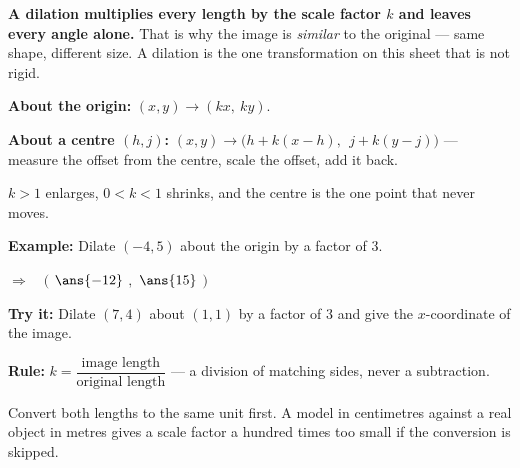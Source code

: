 \documentclass[12pt]{article}
\begin{document}

\begin{formulabox}
\textbf{A dilation multiplies every length by the scale factor $k$ and leaves every angle alone.} That is why the image is \emph{similar} to the original --- same shape, different size. A dilation is the one transformation on this sheet that is not rigid.
\end{formulabox}


\begin{formulabox}
\textbf{About the origin:} $(x, y) \to (kx,\ ky)$.\par
\textbf{About a centre $(h, j)$:} $(x, y) \to \bigl(h + k(x - h),\ \ j + k(y - j)\bigr)$ --- measure the offset from the centre, scale the offset, add it back.\par
$k > 1$ enlarges, $0 < k < 1$ shrinks, and the centre is the one point that never moves.
\end{formulabox}

\begin{examplebox}
\textbf{Example:} \quad Dilate $(-4, 5)$ about the origin by a factor of $3$.

$\Rightarrow\quad ($ $\ans{-12}$ $,$ $\ans{15}$ $)$
\end{examplebox}

\begin{tryitbox}
\textbf{Try it:} \quad Dilate $(7, 4)$ about $(1, 1)$ by a factor of $3$ and give the $x$-coordinate of the image.\\[2pt]
\end{tryitbox}


\begin{formulabox}
\textbf{Rule:} $k = \dfrac{\text{image length}}{\text{original length}}$ --- a division of matching sides, never a subtraction.\par
Convert both lengths to the same unit first. A model in centimetres against a real object in metres gives a scale factor a hundred times too small if the conversion is skipped.
\end{formulabox}
\end{document}
